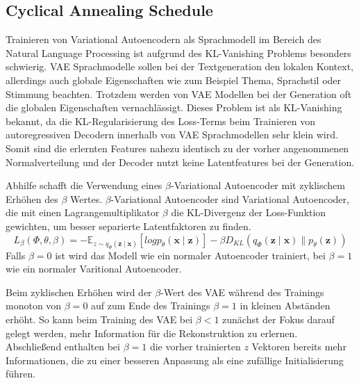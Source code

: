 \subsection{Cyclical Annealing Schedule}
\label{cyc_anneal}
Trainieren von Variational Autoencodern als Sprachmodell im Bereich des Natural Language Processing ist aufgrund des KL-Vanishing Problems besonders schwierig.
VAE Sprachmodelle sollen bei der Textgeneration den lokalen Kontext, allerdings auch globale Eigenschaften wie zum Beispiel Thema, Sprachstil oder Stimmung beachten. 
Trotzdem werden von VAE Modellen bei der Generation oft die globalen Eigenschaften vernachlässigt. 
Dieses Problem ist als KL-Vanishing bekannt, da die KL-Regularisierung des Loss-Terms beim Trainieren von autoregressiven Decodern innerhalb von VAE Sprachmodellen sehr klein wird.
Somit sind die erlernten Features nahezu identisch zu der vorher angenommenen Normalverteilung und der Decoder nutzt keine Latentfeatures bei der Generation. %

Abhilfe schafft die Verwendung eines $\beta$-Variational Autoencoder \citep{cyc_anneal} mit zyklischem Erhöhen des $\beta$ Wertes.
$\beta$-Variational Autoencoder sind Variational Autoencoder, die mit einen Lagrangemultiplikator $\beta$ die KL-Divergenz der Loss-Funktion gewichten, um besser separierte Latentfaktoren zu finden.
\begin{equation}
    L_{\beta}(\Phi,\theta,\beta) = -\mathbb{E}_{z\sim q_\Phi(\mathbf{z\mid x})}[log p_\theta (\mathbf{x\mid z})]- \beta D_{KL}(q_\Phi(\mathbf{z\mid x}) \parallel p_\theta(\mathbf{z})) 
\end{equation}
Falls $\beta = 0$ ist wird das Modell wie ein normaler Autoencoder trainiert, bei $\beta = 1$ wie ein normaler Varitional Autoencoder.

Beim zyklischen Erhöhen wird der $\beta$-Wert des VAE während des Trainings monoton von $\beta=0$ auf zum Ende des Trainings $\beta=1$ in kleinen Abständen erhöht.
So kann beim Training des VAE bei $\beta<1$ zunächst der Fokus darauf gelegt werden, mehr Information für die Rekonstruktion zu erlernen. 
Abschließend enthalten bei $\beta=1$ die vorher trainierten $z$ Vektoren bereits mehr Informationen, die zu einer besseren Anpassung als eine zufällige Initialisierung führen.



